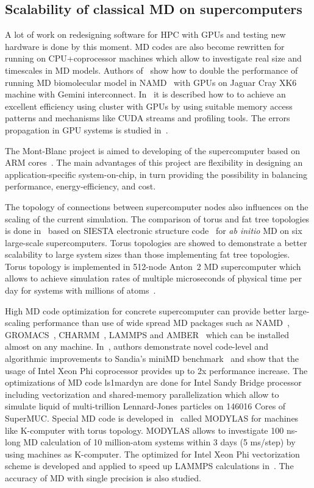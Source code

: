 \documentclass{llncs}
\begin{document}
\subsection{Scalability of classical MD on supercomputers}

A lot of work on redesigning software for HPC with GPUs and testing new hardware is done by this moment. MD codes are also become rewritten for running on CPU+coprocessor machines which allow to investigate real size and timescales in MD models. Authors of~\cite{Sun2012} show how to double the performance of running MD biomolecular model in NAMD~\cite{NAMD} with GPUs on Jaguar Cray XK6 machine with Gemini interconnect. In~\cite{Bernaschi2015} it is described how to to achieve an excellent efficiency using cluster with GPUs by using suitable memory access patterns and mechanisms like CUDA streams and profiling tools. The errors propagation in GPU systems is studied in~\cite{Li2016}.

The Mont-Blanc project is aimed to developing of the supercomputer based on ARM cores~\cite{Rajovic2016}. The main advantages of this project are flexibility in designing an application-specific system-on-chip, in turn providing the possibility in balancing performance, energy-efficiency, and cost.

The topology of connections between supercomputer nodes also influences on the scaling of the current simulation. The comparison of torus and fat tree topologies is done in~\cite{Corsetti2014} based on SIESTA electronic structure code~\cite{SIESTA} for \textit{ab initio} MD on six large-scale supercomputers. Torus topologies are showed to demonstrate a better scalability to large system sizes than those implementing fat tree topologies. Torus topology is implemented in 512-node Anton~2 MD supercomputer which allows to achieve simulation rates of multiple microseconds of physical time per day for systems with millions of atoms~\cite{Shaw2014}.

High MD code optimization for concrete supercomputer can provide better large-scaling performance than use of wide spread MD packages such as NAMD~\cite{NAMD}, GROMACS~\cite{GROMACS}, CHARMM~\cite{CHARMM}, LAMMPS and AMBER~\cite{AMBER} which can be installed almost on any machine.  In~\cite{Pennycook2013}, authors demonstrate novel code-level and algorithmic improvements to Sandia's miniMD benchmark~\cite{SandiaMD} and show that the usage of Intel Xeon Phi coprocessor provides up to 2x performance increase. The optimizations of MD code ls1mardyn are done for Intel Sandy Bridge processor including vectorization and shared-memory parallelization which allow to simulate liquid of multi-trillion Lennard-Jones particles on 146016 Cores of SuperMUC. Special MD code is developed in~\cite{Yoshii2015} called MODYLAS for machines like K-computer with torus topology. MODYLAS allows to investigate 100 ns-long MD calculation of 10 million-atom systems within 3 days (5 ms/step) by using machines as K-computer. The optimized for Intel Xeon Phi vectorization scheme is developed and applied to speed up LAMMPS calculations in~\cite{Hohnerbach2016}. The accuracy of MD with single precision is also studied.
\end{document}
